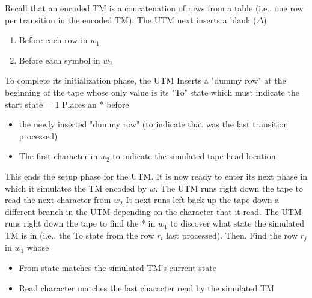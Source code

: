 \documentclass{report}
\begin{document}
\begin{itemize}
\begin{enumerate}
            \end{enumerate}
            \bigbreak \noindent 
            Recall that an encoded TM is a concatenation of rows from a table (i.e., one row per transition in the encoded TM).
            \bigbreak \noindent 
            The UTM next inserts a blank ($\Delta$)
            \begin{enumerate}
                \item Before each row in $w_{1}$
                \item Before each symbol in $w_{2}$
            \end{enumerate}
            \bigbreak \noindent 
            \bigbreak \noindent 
            To complete its initialization phase, the UTM Inserts a "dummy row" at the beginning of the tape whose only value is its "To" state which must indicate the start state = 1
            \bigbreak \noindent 
            Places an * before
            \begin{itemize}
                \item the newly inserted "dummy row" (to indicate that was the last transition processed)
                \item The first character in $w_{2}$ to indicate the simulated tape head location
            \end{itemize}
            \bigbreak \noindent 
            This ends the setup phase for the UTM. It is now ready to enter its next phase in which it simulates the TM encoded by $w$.
            \bigbreak \noindent 
            The UTM runs right down the tape to read the next character from $w_{2}$
            \bigbreak \noindent 
            It next runs left back up the tape down a different branch in the UTM depending on the character that it read.
            \bigbreak \noindent 
            \bigbreak \noindent 
            The UTM runs right down the tape to find the * in $w_{1}$ to discover what state the simulated TM is in (i.e., the To state from the row $r_{i}$ last processed).
            \bigbreak \noindent 
            Then, Find the row $r_{j}$ in $w_{1}$ whose
            \begin{itemize}
                \item From state matches the simulated TM's current state
                \item Read character matches the last character read by the simulated TM
            \end{itemize}
            \bigbreak \noindent 

\end{itemize}
\end{document}
